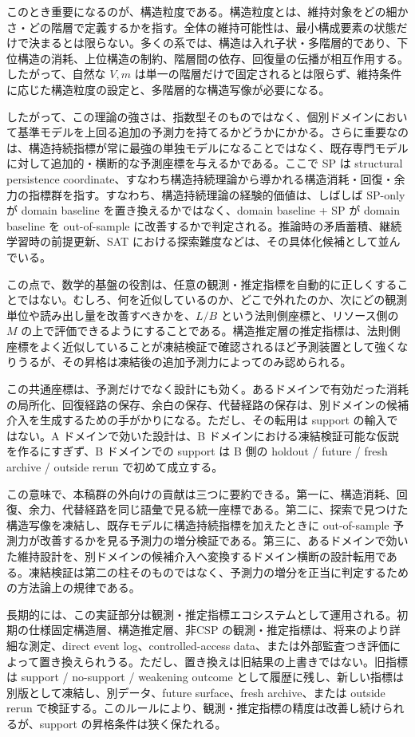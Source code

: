 \documentclass[12pt,a4paper]{article}
\begin{document}
このとき重要になるのが、構造粒度である。構造粒度とは、維持対象をどの細かさ・どの階層で定義するかを指す。全体の維持可能性は、最小構成要素の状態だけで決まるとは限らない。多くの系では、構造は入れ子状・多階層的であり、下位構造の消耗、上位構造の制約、階層間の依存、回復量の伝播が相互作用する。したがって、自然な \(V,m\) は単一の階層だけで固定されるとは限らず、維持条件に応じた構造粒度の設定と、多階層的な構造写像が必要になる。

したがって、この理論の強さは、指数型そのものではなく、個別ドメインにおいて基準モデルを上回る追加の予測力を持てるかどうかにかかる。さらに重要なのは、構造持続指標が常に最強の単独モデルになることではなく、既存専門モデルに対して追加的・横断的な予測座標を与えるかである。ここで SP は structural persistence coordinate、すなわち構造持続理論から導かれる構造消耗・回復・余力の指標群を指す。すなわち、構造持続理論の経験的価値は、しばしば SP-only が domain baseline を置き換えるかではなく、domain baseline + SP が domain baseline を out-of-sample に改善するかで判定される。推論時の矛盾蓄積、継続学習時の前提更新、SAT における探索難度などは、その具体化候補として並んでいる。

この点で、数学的基盤の役割は、任意の観測・推定指標を自動的に正しくすることではない。むしろ、何を近似しているのか、どこで外れたのか、次にどの観測単位や読み出し量を改善すべきかを、\(L/B\) という法則側座標と、リソース側の \(M\) の上で評価できるようにすることである。構造推定層の推定指標は、法則側座標をよく近似していることが凍結検証で確認されるほど予測装置として強くなりうるが、その昇格は凍結後の追加予測力によってのみ認められる。

この共通座標は、予測だけでなく設計にも効く。あるドメインで有効だった消耗の局所化、回復経路の保存、余白の保存、代替経路の保存は、別ドメインの候補介入を生成するための手がかりになる。ただし、その転用は support の輸入ではない。A ドメインで効いた設計は、B ドメインにおける凍結検証可能な仮説を作るにすぎず、B ドメインでの support は B 側の holdout / future / fresh archive / outside rerun で初めて成立する。

この意味で、本稿群の外向けの貢献は三つに要約できる。第一に、構造消耗、回復、余力、代替経路を同じ語彙で見る統一座標である。第二に、探索で見つけた構造写像を凍結し、既存モデルに構造持続指標を加えたときに out-of-sample 予測力が改善するかを見る予測力の増分検証である。第三に、あるドメインで効いた維持設計を、別ドメインの候補介入へ変換するドメイン横断の設計転用である。凍結検証は第二の柱そのものではなく、予測力の増分を正当に判定するための方法論上の規律である。

長期的には、この実証部分は観測・推定指標エコシステムとして運用される。初期の仕様固定構造層、構造推定層、非CSP の観測・推定指標は、将来のより詳細な測定、direct event log、controlled-access data、または外部監査つき評価によって置き換えられうる。ただし、置き換えは旧結果の上書きではない。旧指標は support / no-support / weakening outcome として履歴に残し、新しい指標は別版として凍結し、別データ、future surface、fresh archive、または outside rerun で検証する。このルールにより、観測・推定指標の精度は改善し続けられるが、support の昇格条件は狭く保たれる。
\end{document}
